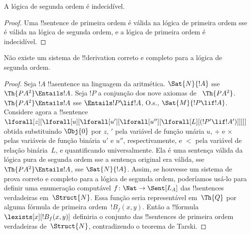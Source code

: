 \documentclass[../../../include/open-logic-section]{subfiles}
\begin{document}



\begin{thm}
A lógica de segunda ordem é indecidível.
\end{thm}

\begin{proof}
Uma !!{sentence} de primeira ordem é válida na lógica de primeira ordem sse
é válida na lógica de segunda ordem, e a lógica de primeira ordem é
indecidível.
\end{proof}

\begin{thm}
Não existe um sistema de !!{derivation} correto e completo para a lógica de
segunda ordem.
\end{thm}

\begin{proof}
Seja $!A$ !!a{sentence} na linguagem da aritmética. $\Sat{N}{!A}$ sse
$\Th{PA^2} \Entails !A$. Seja $!P$ a conjunção dos nove axiomas de
~$\Th{PA^2}$. $\Th{PA^2} \Entails !A$ sse $\Entails !P \lif !A$, O.s.\@,
$\Sat{M}{!P \lif !A}$. Considere agora a !!{sentence}
$\lforall[z][\lforall[u][\lforall[u'][\lforall[u''][\lforall[L][(!P' \lif !A')]]]]]$
obtida substituindo $\Obj{0}$ por $z$, $\prime$ pela variável de função
unária $u$, $+$ e $\times$ pelas variáveis de função binária $u'$ e $u''$,
respectivamente, e $<$ pela variável de relação binária~$L$, e quantificando
universalmente. Ela é uma sentença válida da lógica pura de segunda ordem
sse a sentença original era válida, sse $\Th{PA^2} \Entails !A$, sse
$\Sat{N}{!A}$. Assim, se houvesse um sistema de prova correto e completo
para a lógica de segunda ordem, poderíamos usá-lo para definir uma
enumeração computável $f\colon \Nat \to \Sent[L_A]$ das !!{sentence}s
verdadeiras em~$\Struct{N}$. Essa função seria representável em~$\Th{Q}$
por alguma fórmula de primeira ordem~$!B_f(x, y)$. Então a
!!{formula}~$\lexists[x][!B_f(x, y)]$ definiria o conjunto das !!{sentence}s
de primeira ordem verdadeiras de~$\Struct{N}$, contradizendo o teorema de
Tarski.
\end{proof}
\end{document}
